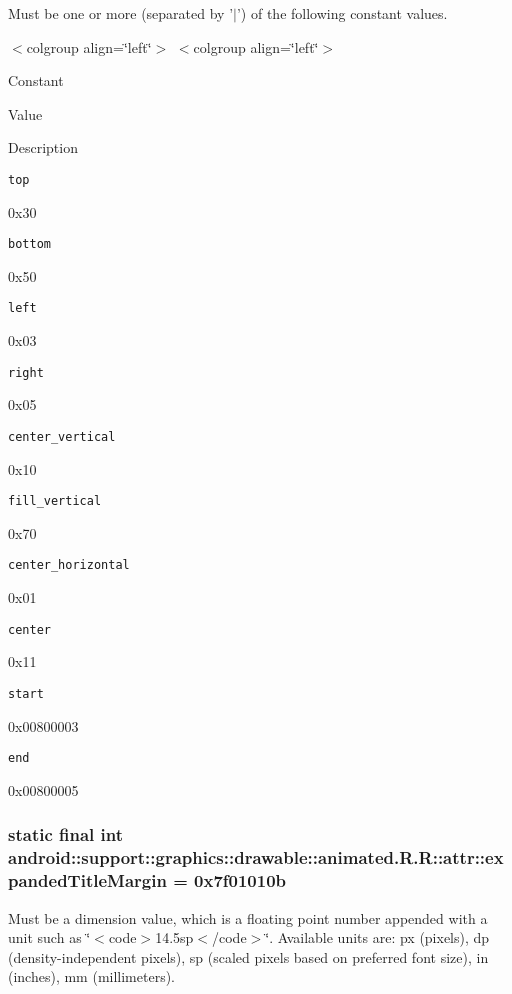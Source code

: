 Must be one or more (separated by '$|$') of the following constant values. \begin{TabularC}{0}
\hline
\end{TabularC}
$<$colgroup align=\char`\"{}left\char`\"{}$>$ $<$colgroup align=\char`\"{}left\char`\"{}$>$ 

Constant

Value

Description 

{\tt top}

0x30

{\tt bottom}

0x50

{\tt left}

0x03

{\tt right}

0x05

{\tt center\_\-vertical}

0x10

{\tt fill\_\-vertical}

0x70

{\tt center\_\-horizontal}

0x01

{\tt center}

0x11

{\tt start}

0x00800003

{\tt end}

0x00800005\hypertarget{classandroid_1_1support_1_1graphics_1_1drawable_1_1animated_1_1_r_1_1attr_54fb213e14ae162bd101111d901a24e5}{
\subsubsection[{expandedTitleMargin}]{\setlength{\rightskip}{0pt plus 5cm}static final int android::support::graphics::drawable::animated.R.R::attr::expandedTitleMargin = 0x7f01010b}}
\label{classandroid_1_1support_1_1graphics_1_1drawable_1_1animated_1_1_r_1_1attr_54fb213e14ae162bd101111d901a24e5}


Must be a dimension value, which is a floating point number appended with a unit such as \char`\"{}$<$code$>$14.5sp$<$/code$>$\char`\"{}. Available units are: px (pixels), dp (density-independent pixels), sp (scaled pixels based on preferred font size), in (inches), mm (millimeters). 

